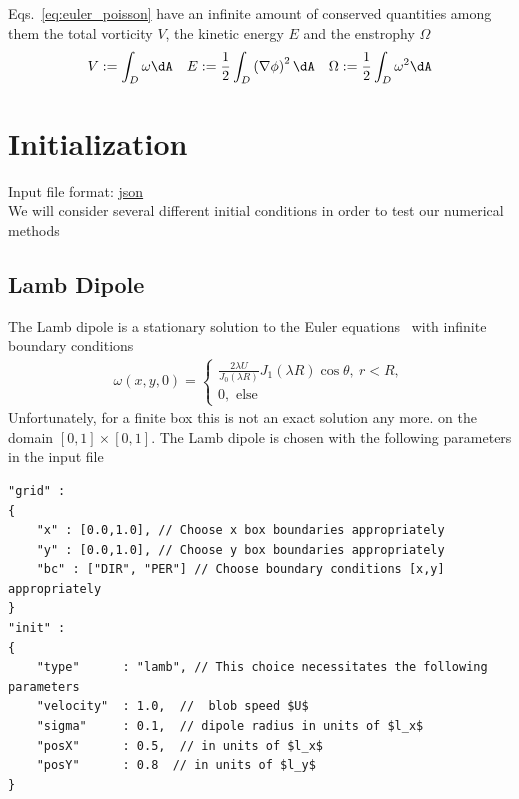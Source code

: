 Eqs.~\eqref{eq:euler_poisson} have an infinite amount of conserved quantities
among them the total vorticity $V$, the kinetic energy $E$ and the enstrophy $\Omega$
 \begin{align}
     V := \int_D \omega \dA\quad
     E :=\frac{1}{2} \int_D \left( \nabla \phi\right)^2 \dA \quad
     \Omega:= \frac{1}{2} \int_D \omega^2 \dA
 \end{align}


\section{Initialization}
Input file format: \href{https://en.wikipedia.org/wiki/JSON}{json} \\
We will consider several different initial conditions in order to test
our numerical methods
\subsection{Lamb Dipole}
The Lamb dipole is a stationary solution to the Euler equations~\cite{Nielsen1997} with infinite
boundary conditions
\begin{align}
    \omega(x,y,0) = \begin{cases}
        \frac{2\lambda U}{J_0(\lambda R)} J_1(\lambda R) \cos \theta,\ r < R,\\
        0, \text{ else}
    \end{cases}
\end{align}
Unfortunately, for a finite box this is not an exact solution any more.
on the domain $[0,1]\times [0,1]$.
The Lamb dipole is chosen with the following parameters in the input file
\begin{verbatim}
"grid" :
{
    "x" : [0.0,1.0], // Choose x box boundaries appropriately
    "y" : [0.0,1.0], // Choose y box boundaries appropriately
    "bc" : ["DIR", "PER"] // Choose boundary conditions [x,y] appropriately
}
"init" :
{
    "type"      : "lamb", // This choice necessitates the following parameters
    "velocity"  : 1.0,  //  blob speed $U$
    "sigma"     : 0.1,  // dipole radius in units of $l_x$
    "posX"      : 0.5,  // in units of $l_x$
    "posY"      : 0.8  // in units of $l_y$
}
\end{verbatim}
